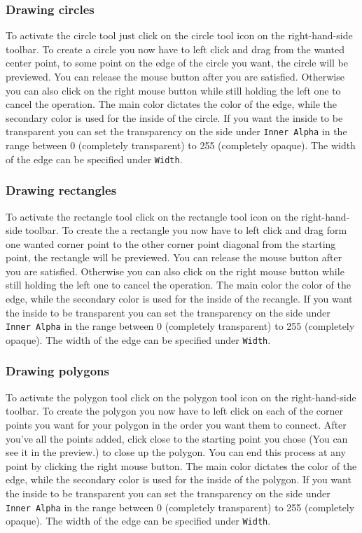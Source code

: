 \documentclass[a4paper, 12pt]{article}
\begin{document}
\subsubsection{Drawing circles}
To activate the circle tool just click on the circle tool icon on the right-hand-side toolbar.
To create a circle you now have to left click and drag from the wanted center point, to some point on the edge of the circle you want, the circle will be previewed. You can release the mouse button after you are satisfied. Otherwise you can also click on the right mouse button while still holding the left one to cancel the operation.
The main color dictates the color of the edge, while the secondary color is used for the inside of the circle. If you want the inside to be transparent you can set the transparency on the side under \texttt{Inner Alpha} in the range between 0 (completely transparent) to 255 (completely opaque). The width of the edge can be specified under \texttt{Width}.

\subsubsection{Drawing rectangles}
To activate the rectangle tool click on the rectangle tool icon on the right-hand-side toolbar.
To create the a rectangle you now have to left click and drag form one wanted corner point to the other corner point diagonal from the starting point, the rectangle will be previewed. You can release the mouse button after you are satisfied.
Otherwise you can also click on the right mouse button while still holding the left one to cancel the operation.
The main color the color of the edge, while the secondary color is used for the inside of the recangle. If you want the inside to be transparent you can set the transparency on the side under \texttt{Inner Alpha} in the range between 0 (completely transparent) to 255 (completely opaque). The width of the edge can be specified under \texttt{Width}.

\subsubsection{Drawing polygons}
To activate the polygon tool click on the polygon tool icon on the right-hand-side toolbar.
To create the polygon you now have to left click on each of the corner points you want for your polygon in the order you want them to connect.
After you've all the points added, click close to the starting point you chose (You can see it in the preview.) to close up the polygon. You can end this process at any point by clicking the right mouse button.
The main color dictates the color of the edge, while the secondary color is used for the inside of the polygon. If you want the inside to be transparent you can set the transparency on the side under \texttt{Inner Alpha} in the range between 0 (completely transparent) to 255 (completely opaque). The width of the edge can be specified under \texttt{Width}.
\end{document}
